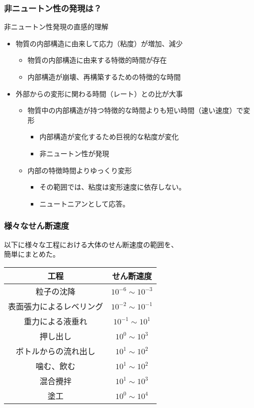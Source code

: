\documentclass[12pt, dvipdfmx]{beamer}
\begin{document}
\begin{frame}
	\frametitle{非ニュートン性の発現は？}
		\begin{block}{非ニュートン性発現の直感的理解}
			\begin{itemize}
				\item 物質の内部構造に由来して応力（粘度）が増加、減少
				\begin{itemize}
					\item 物質の内部構造に由来する特徴的時間が存在
					\item 内部構造が崩壊、再構築するための特徴的な時間
				\end{itemize}
				\item 外部からの変形に関わる時間（レート）との比が大事
				\begin{itemize}
					\item 物質中の内部構造が持つ特徴的な時間よりも短い時間（速い速度）で変形
					\begin{itemize}
						\item 内部構造が変化するため巨視的な粘度が変化
						\item \alert{非ニュートン性が発現}
					\end{itemize}
					\item 内部の特徴時間よりゆっくり変形
					\begin{itemize}
						\item その範囲では、粘度は変形速度に依存しない。
						\item ニュートニアンとして応答。
					\end{itemize}
				\end{itemize}
			\end{itemize}
		\end{block}
\end{frame}

\begin{frame}
	\frametitle{様々なせん断速度}
		以下に様々な工程における大体のせん断速度の範囲を、\\簡単にまとめた。
			\begin{center}
				\begin{tabular}{c|c} \hline
					工程 & せん断速度 \\ \hline \hline
					粒子の沈降	& $10^{-6} \sim 10^{-3}$ \\ \hline
					表面張力によるレベリング	& $10^{-2} \sim 10^{-1}$ \\ \hline
					重力による液垂れ	& $10^{-1} \sim 10^{1}$ \\ \hline \hline
					押し出し	& $10^{0} \sim 10^{3}$ \\ \hline
					ボトルからの流れ出し	& $10^{1} \sim 10^{2}$ \\ \hline
					噛む、飲む	& $10^{1} \sim 10^{2}$ \\ \hline
					混合攪拌	& $10^{1} \sim 10^{3}$ \\ \hline
					塗工	& $10^{0} \sim 10^{4}$ \\ \hline
				\end{tabular}
			\end{center}
\end{frame}
\end{document}
